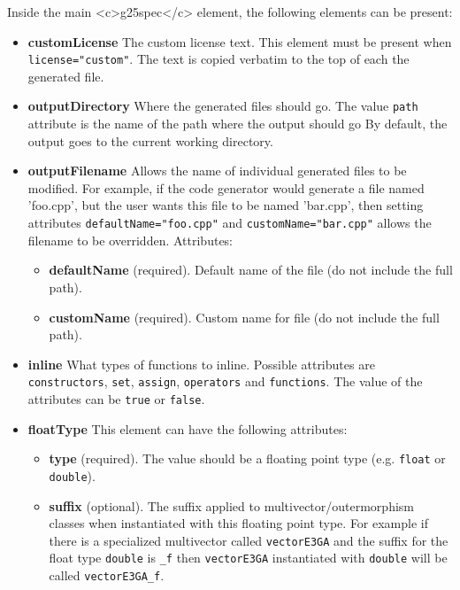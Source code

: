 \documentclass[10pt, a4paper]{article}
\begin{document}
  
Inside the main <c>g25spec</c> element, the following elements can be present:
\begin{itemize}
\item {\bf customLicense} The custom license text. This element must be present when {\tt license="custom"}. 
         The text is copied verbatim to the top of each the generated file.
         
\item {\bf outputDirectory} Where the generated files should go. The value {\tt path} attribute is the name of the path
	where the output should go
       By default, the output goes to the current working directory.
       
\item {\bf outputFilename} Allows the name of individual generated files to be modified. For example, if the code generator 
       would generate a file named 'foo.cpp', but the user wants this file to be named 'bar.cpp', then setting 
       attributes {\tt defaultName="foo.cpp"} and {\tt customName="bar.cpp"}
       allows the filename to be overridden. Attributes:
       \begin{itemize}
       \item {\bf defaultName} (required). Default name of the file (do not include the full path).
       \item {\bf customName} (required). Custom name for file (do not include the full path).
       \end{itemize}
         
\item {\bf inline} What types of functions to inline. Possible attributes are {\tt constructors}, 
      {\tt set}, {\tt assign}, {\tt operators} and {\tt functions}.
      The value of the attributes can be {\tt true} or {\tt false}.
      
\item {\bf floatType} This element can have the following attributes:
       \begin{itemize}
       \item {\bf type} (required). The value should be a floating point type (e.g. {\tt float} or {\tt double}).
       
       \item {\bf suffix} (optional). The suffix applied to multivector/outermorphism classes when instantiated with this
            floating point type. For example if there is a specialized multivector called {\tt vectorE3GA} and the suffix
            for the float type {\tt double} is {\tt \_f} then {\tt vectorE3GA} instantiated with {\tt double}
            will be called {\tt vectorE3GA\_f}.
            

\end{itemize}
\end{itemize}
\end{document}
